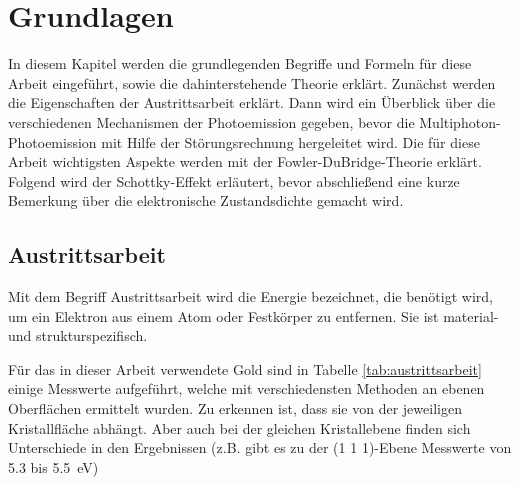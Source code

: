 \documentclass[bachelor,       %
               twoside,        %
               BCOR10mm,       %
               english,ngerman, %
               ]{GAUBM}
\begin{document}
\chapter{Grundlagen}
In diesem Kapitel werden die grundlegenden Begriffe und Formeln für diese Arbeit eingeführt, sowie die dahinterstehende Theorie erklärt.
Zunächst werden die Eigenschaften der Austrittsarbeit erklärt.
Dann wird ein Überblick über die verschiedenen Mechanismen der Photoemission gegeben, bevor die Multiphoton-Photoemission mit Hilfe der Störungsrechnung hergeleitet wird.
Die für diese Arbeit wichtigsten Aspekte werden mit der Fowler-DuBridge-Theorie erklärt.
Folgend wird der Schottky-Effekt erläutert, bevor abschließend eine kurze Bemerkung über die elektronische Zustandsdichte gemacht wird.


\section{Austrittsarbeit}
Mit dem Begriff Austrittsarbeit wird die Energie bezeichnet, die benötigt wird, um ein Elektron aus einem Atom oder Festkörper zu entfernen.
Sie ist material- und strukturspezifisch. 

Für das in dieser Arbeit verwendete Gold sind in Tabelle \ref{tab:austrittsarbeit} einige Messwerte aufgeführt, welche mit verschiedensten Methoden an ebenen Oberflächen ermittelt wurden.
Zu erkennen ist, dass sie von der jeweiligen Kristallfläche abhängt.
Aber auch bei der gleichen Kristallebene finden sich Unterschiede in den Ergebnissen (z.B. gibt es zu der (1 1 1)-Ebene Messwerte von 5.3 bis \SI{5.5}{\eV})
\end{document}

